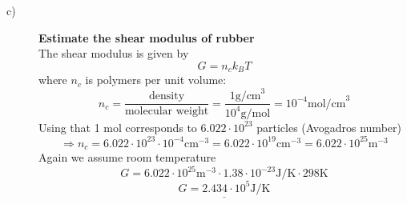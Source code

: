 \documentclass[norsk,a4paper,12pt]{article}
\begin{document}
\begin{description}
\item [c)] \textbf{Estimate the shear modulus of rubber}\\
The shear modulus is given by
\begin{equation}
G=n_ck_BT
\end{equation}
where $n_c$ is polymers per unit volume:
$$n_c=\frac{\text{density}}{\text{molecular weight}}=\frac{1\text{g/cm}^3}{10^4\text{g/mol}}=10^{-4}\text{mol/cm}^3$$
Using that 1 mol corresponds to $6.022\cdot10^{23}$ particles (Avogadros number)
$$\Rightarrow n_c=6.022\cdot10^{23}\cdot10^{-4}\text{cm}^{-3}=6.022\cdot10^{19}\text{cm}^{-3}=6.022\cdot10^{25}\text{m}^{-3}$$
Again we assume room temperature
$$G=6.022\cdot10^{25}\text{m}^{-3}\cdot1.38\cdot10^{-23}\text{J/K}\cdot298\text{K}$$
\begin{equation}
\underline{G=2.434\cdot10^5 \text{J/K}}
\end{equation}
\end{description}
\end{document}
